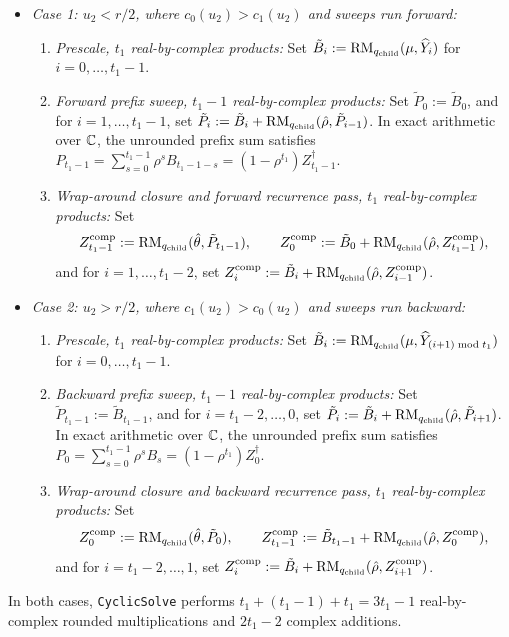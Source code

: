 \begin{itemize}[leftmargin=*]
  \item \emph{Case 1: $u_2 < r/2$, where $c_0(u_2) > c_1(u_2)$ and sweeps run forward:}
  \begin{enumerate}[label=\arabic*.,leftmargin=*]
    \item \emph{Prescale, $t_1$ real-by-complex products:} Set $\tilde{B}_i := \operatorname{RM}_{q_{\mathrm{child}}}(\mu, \widehat{Y}_i)$ for $i = 0, \dots, t_1-1$.
    \item \emph{Forward prefix sweep, $t_1 - 1$ real-by-complex products:} Set $\tilde{P}_0 := \tilde{B}_0$, and for $i = 1, \dots, t_1-1$, set $\tilde{P}_i := \tilde{B}_i + \operatorname{RM}_{q_{\mathrm{child}}}(\hat{\rho}, \tilde{P}_{i-1})$. In exact arithmetic over $\mathbb{C}$, the unrounded prefix sum satisfies $P_{t_1-1} = \sum_{s=0}^{t_1-1} \rho^s B_{t_1-1-s} = (1 - \rho^{t_1})Z^\dagger_{t_1-1}$.
    \item \emph{Wrap-around closure and forward recurrence pass, $t_1$ real-by-complex products:} Set
    \[
      Z^{\mathrm{comp}}_{t_1-1} := \operatorname{RM}_{q_{\mathrm{child}}}(\hat{\theta}, \tilde{P}_{t_1-1}), \qquad Z^{\mathrm{comp}}_0 := \tilde{B}_0 + \operatorname{RM}_{q_{\mathrm{child}}}(\hat{\rho}, Z^{\mathrm{comp}}_{t_1-1}),
    \]
    and for $i = 1, \dots, t_1-2$, set $Z^{\mathrm{comp}}_i := \tilde{B}_i + \operatorname{RM}_{q_{\mathrm{child}}}(\hat{\rho}, Z^{\mathrm{comp}}_{i-1})$.
  \end{enumerate}
  \item \emph{Case 2: $u_2 > r/2$, where $c_1(u_2) > c_0(u_2)$ and sweeps run backward:}
  \begin{enumerate}[label=\arabic*.,leftmargin=*]
    \item \emph{Prescale, $t_1$ real-by-complex products:} Set $\tilde{B}_i := \operatorname{RM}_{q_{\mathrm{child}}}(\mu, \widehat{Y}_{(i+1)\bmod t_1})$ for $i = 0, \dots, t_1-1$.
    \item \emph{Backward prefix sweep, $t_1 - 1$ real-by-complex products:} Set $\tilde{P}_{t_1-1} := \tilde{B}_{t_1-1}$, and for $i = t_1-2, \dots, 0$, set $\tilde{P}_i := \tilde{B}_i + \operatorname{RM}_{q_{\mathrm{child}}}(\hat{\rho}, \tilde{P}_{i+1})$. In exact arithmetic over $\mathbb{C}$, the unrounded prefix sum satisfies $P_0 = \sum_{s=0}^{t_1-1} \rho^s B_s = (1 - \rho^{t_1})Z^\dagger_0$.
    \item \emph{Wrap-around closure and backward recurrence pass, $t_1$ real-by-complex products:} Set
    \[
      Z^{\mathrm{comp}}_0 := \operatorname{RM}_{q_{\mathrm{child}}}(\hat{\theta}, \tilde{P}_0), \qquad Z^{\mathrm{comp}}_{t_1-1} := \tilde{B}_{t_1-1} + \operatorname{RM}_{q_{\mathrm{child}}}(\hat{\rho}, Z^{\mathrm{comp}}_0),
    \]
    and for $i = t_1-2, \dots, 1$, set $Z^{\mathrm{comp}}_i := \tilde{B}_i + \operatorname{RM}_{q_{\mathrm{child}}}(\hat{\rho}, Z^{\mathrm{comp}}_{i+1})$.
  \end{enumerate}
\end{itemize}
In both cases, \texttt{CyclicSolve} performs $t_1 + (t_1 - 1) + t_1 = 3 t_1 - 1$ real-by-complex rounded multiplications and $2 t_1 - 2$ complex additions.

